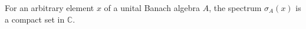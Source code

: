 For an arbitrary element $x$ of a unital Banach algebra $A$, the spectrum $\sigma_A(x)$ is a compact set in $\mathbb{C}$.
